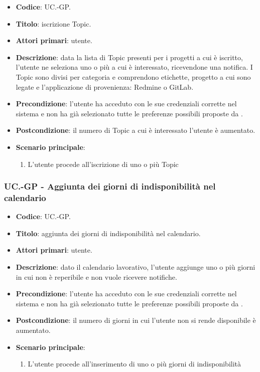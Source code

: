 		\begin{itemize}
			\item \textbf{Codice}: UC\theuccount.\thesubuccount-GP.
			\item \textbf{Titolo}: iscrizione Topic.
			\item \textbf{Attori primari}: utente.
			\item \textbf{Descrizione}: data la lista di Topic presenti per i progetti a cui è iscritto, l’utente ne seleziona uno o	più a cui è interessato, ricevendone una notifica. I Topic sono divisi per categoria e	comprendono etichette, progetto a cui sono legate e l'applicazione di provenienza: Redmine o GitLab.
			\item \textbf{Precondizione}: l’utente ha acceduto con le sue credenziali corrette nel sistema e non ha già selezionato tutte le preferenze possibili proposte da \progetto.
			\item \textbf{Postcondizione}: il numero di Topic a cui è interessato l’utente è aumentato.
			\item \textbf{Scenario principale}:
			\begin{enumerate}
				\item L'utente procede all'iscrizione di uno o più Topic
			\end{enumerate}
		\end{itemize}

	\subsubsection{UC\theuccount.\thesubuccount-GP - Aggiunta dei giorni di indisponibilità nel calendario}

		\begin{itemize}
			\item \textbf{Codice}: UC\theuccount.\thesubuccount-GP.
			\item \textbf{Titolo}: aggiunta dei giorni di indisponibilità nel calendario.
			\item \textbf{Attori primari}: utente.
			\item \textbf{Descrizione}: dato il calendario lavorativo, l’utente aggiunge uno o più giorni in cui non è reperibile e non vuole ricevere notifiche.
			\item \textbf{Precondizione}: l’utente ha acceduto con le sue credenziali corrette nel sistema e non ha già selezionato tutte le preferenze possibili proposte da \progetto.
			\item \textbf{Postcondizione}: il numero di giorni in cui l’utente non si rende disponibile è aumentato.
			\item \textbf{Scenario principale}:
			\begin{enumerate}
				\item L'utente procede all'inserimento di uno o più giorni di indisponibilità
			\end{enumerate}
		\end{itemize}

